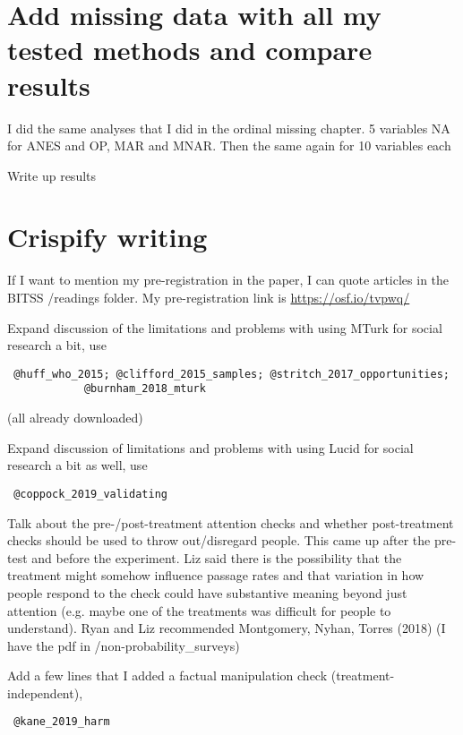 \documentclass[12pt]{article}
\begin{document}
\section*{Add missing data with all my tested methods and compare results}
	\begin{coi}
		\item I did the same analyses that I did in the ordinal missing chapter. 5 variables NA for ANES and OP, MAR and MNAR. Then the same again for 10 variables each
		\item Write up results
	\end{coi}


\section*{Crispify writing}
	\begin{coi}
		\item If I want to mention my pre-registration in the paper, I can quote articles in the BITSS /readings folder. My pre-registration link is \href{https://osf.io/tvpwq/}{https://osf.io/tvpwq/}
		\item Expand discussion of the limitations and problems with using MTurk for social research a bit, use \begin{verbatim} @huff_who_2015; @clifford_2015_samples; @stritch_2017_opportunities; 
			@burnham_2018_mturk \end{verbatim} (all already downloaded)
		\item Expand discussion of limitations and problems with using Lucid for social research a bit as well, use \begin{verbatim} @coppock_2019_validating \end{verbatim}
		\item Talk about the pre-/post-treatment attention checks and whether post-treatment checks should be used to throw out/disregard people. This came up after the pre-test and before the experiment. Liz said there is the possibility that the treatment might somehow influence passage rates and that variation in how people respond to the check could have substantive meaning beyond just attention (e.g. maybe one of the treatments was difficult for people to understand). Ryan and Liz recommended Montgomery, Nyhan, Torres (2018) (I have the pdf in /non-probability\_surveys)
		\item Add a few lines that I added a factual manipulation check (treatment-independent), \begin{verbatim} @kane_2019_harm \end{verbatim}

\end{coi}
\end{document}
